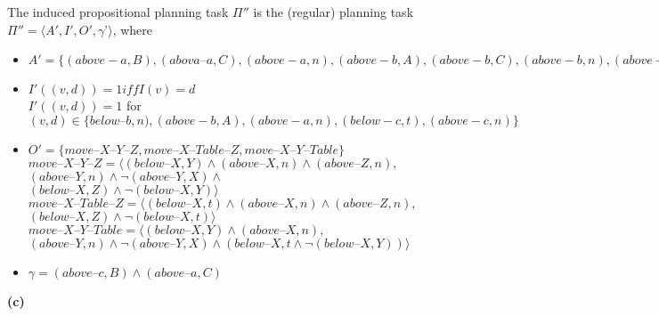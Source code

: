 \documentclass[11pt,a4paper]{article}
\newcommand{\h}[0]{\text{--}}
\begin{document}
The induced propositional planning task $\Pi''$ is the (regular) planning task $\Pi'' = \langle A',I', O', \gamma’\rangle$, where
\begin{itemize}
\item
$A'= \{(above-a, B), (abova\h a, C), (above-a, n), (above-b, A), (above-b, C), (above-b, n), (above-c, A), (above-c, B), (above-c, n), (below-a, B), (below-a, C), (below-a, t), (below-b, A), (below-b, C), (below-b, t), (below-c, A), (below-c, B), (below-c, t) \}$

\item $I'((v,d)) = 1 iff I(v) = d$\\
$I'((v,d)) = 1$ for $(v,d) \in \{below\h b, n), (above-b, A), (above-a, n), (below-c, t), (above-c, n)\}$

\item
$O'=\{move\h X\h Y\h Z,move\h X\h Table\h Z,move\h X\h Y\h Table\}$\\
$move\h X\h Y\h Z=\langle (below\h X, Y) \land (above\h X, n) \land (above\h Z, n),$\\
\hphantom{wwww}$(above\h Y, n) \land \lnot(above\h Y, X) \land $\\
\hphantom{wwww}$(below\h X, Z) \land \lnot(below\h X, Y) \rangle$
\\
$move\h X\h Table\h Z=\langle(below\h X, t) \land (above\h X, n) \land (above\h Z, n),$\\
\hphantom{wwww}$(below\h X, Z) \land \lnot(below\h X, t)\rangle$
\\
$move\h X\h Y\h Table=\langle(below\h X, Y) \land (above\h X, n),$\\
\hphantom{wwww}$(above\h Y, n) \land \lnot(above\h Y, X) \land (below\h X, t \land \lnot(below\h X, Y))\rangle$\\



\item $\gamma=(above\h c, B)\land(above\h a, C)$
\end{itemize}
\textbf{(c)}
\newpage
\end{document}
